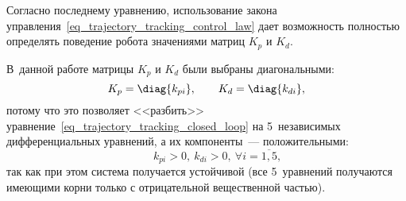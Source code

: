 Согласно последнему уравнению, использование закона управления~\eqref{eq_trajectory_tracking_control_law} дает возможность полностью определять поведение робота значениями матриц $K_p$ и $K_d$.

В~данной работе матрицы $K_p$ и $K_d$ были выбраны диагональными:
\begin{equation}
    K_p = \diag\{k_{pi}\},
    \qquad
    K_d = \diag\{k_{di}\},
\end{equation}
потому что это позволяет <<разбить>> уравнение~\eqref{eq_trajectory_tracking_closed_loop} на 5~независимых дифференциальных уравнений, а их компоненты~--- положительными:
\begin{equation}
    \qquad
    k_{pi} > 0,\ k_{di} > 0,\ \forall i=\overline{1,5},
\end{equation}
так как при этом система получается устойчивой (все 5~уравнений получаются имеющими корни только с отрицательной вещественной частью).

\newpage
